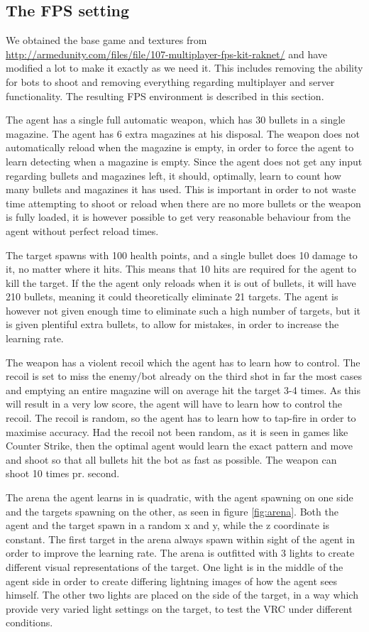 \subsection{The FPS setting}
\label{sec:fpssetting}
We obtained the base game and textures from \url{http://armedunity.com/files/file/107-multiplayer-fps-kit-raknet/} and have modified a lot to make it exactly as we need it. This includes removing the ability for bots to shoot and removing everything regarding multiplayer and server functionality. The resulting FPS environment is described in this section.

The agent has a single full automatic weapon, which has 30 bullets in a single magazine. The agent has 6 extra magazines at his disposal. The weapon does not automatically reload when the magazine is empty, in order to force the agent to learn detecting when a magazine is empty. Since the agent does not get any input regarding bullets and magazines left, it should, optimally, learn to count how many bullets and magazines it has used. This is important in order to not waste time attempting to shoot or reload when there are no more bullets or the weapon is fully loaded, it is however possible to get very reasonable behaviour from the agent without perfect reload times.

The target spawns with 100 health points, and a single bullet does 10 damage to it, no matter where it hits. This means that 10 hits are required for the agent to kill the target. If the the agent only reloads when it is out of bullets, it will have 210 bullets, meaning it could theoretically eliminate 21 targets. The agent is however not given enough time to eliminate such a high number of targets, but it is given plentiful extra bullets, to allow for mistakes, in order to increase the learning rate.

The weapon has a violent recoil which the agent has to learn how to control. The recoil is set to miss the enemy/bot already on the third shot in far the most cases and emptying an entire magazine will on average hit the target 3-4 times. As this will result in a very low score, the agent will have to learn how to control the recoil. The recoil is random, so the agent has to learn how to tap-fire in order to maximise accuracy. Had the recoil not been random, as it is seen in games like Counter Strike, then the optimal agent would learn the exact pattern and move and shoot so that all bullets hit the bot as fast as possible. The weapon can shoot 10 times pr. second.

The arena the agent learns in is quadratic, with the agent spawning on one side and the targets spawning on the other, as seen in figure \ref{fig:arena}. Both the agent and the target spawn in a random x and y, while the z coordinate is constant. The first target in the arena always spawn within sight of the agent in order to improve the learning rate. The arena is outfitted with 3 lights to create different visual representations of the target. One light is in the middle of the agent side in order to create differing lightning images of how the agent sees himself. The other two lights are placed on the side of the target, in a way which provide very varied light settings on the target, to test the VRC under different conditions.


